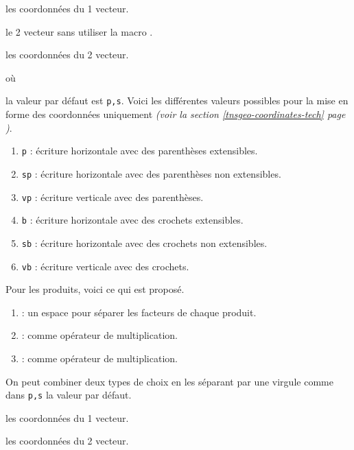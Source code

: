 \documentclass[12pt,a4paper]{article}
\begin{document}
 les coordonnées du 1\ier{} vecteur.

 le 2\ieme{} vecteur sans utiliser la macro .

 les coordonnées du 2\ieme{} vecteur.


\separation


  où \quad {}

\IDoption{} la valeur par défaut est \verb+p,s+. 
            Voici les différentes valeurs possibles pour la mise en forme des coordonnées uniquement \emph{(voir la section \ref{tnsgeo-coordinates-tech} page \pageref{tnsgeo-coordinates-tech})}.
\begin{enumerate}
	\item \verb+p+ : écriture horizontale avec des parenthèses extensibles.

	\item \verb+sp+ : écriture horizontale avec des parenthèses non extensibles.

	\item \verb+vp+ : écriture verticale avec des parenthèses.

	\item \verb+b+ : écriture horizontale avec des crochets extensibles.

	\item \verb+sb+ : écriture horizontale avec des crochets non extensibles.

	\item \verb+vb+ : écriture verticale avec des crochets.
\end{enumerate}

            Pour les produits, voici ce qui est proposé.
\begin{enumerate}
	\item {} : un espace pour séparer les facteurs de chaque produit.

	\item {} :  comme opérateur de multiplication.

	\item {} :  comme opérateur de multiplication.
\end{enumerate}

            On peut combiner deux types de choix en les séparant par une virgule comme dans \verb+p,s+ la valeur par défaut.


 les coordonnées du 1\ier{} vecteur.

 les coordonnées du 2\ieme{} vecteur.
\end{document}
